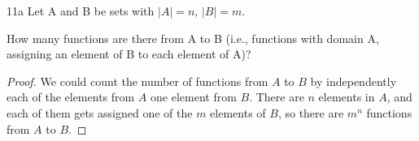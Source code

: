 \begin{exercise}{11a}
Let A and B be sets with $|A| = n$, $|B| = m$.

\vspace{1em}
How many functions are there from A to B (i.e., functions with domain A, assigning
an element of B to each element of A)?
\end{exercise}

\begin{proof}
    We could count the number of functions from $A$ to $B$ by independently each of the elements from $A$ one element from $B$. There are $n$ elements in $A$, and each of them gets assigned one of the $m$ elements of $B$, so there are $m^n$ functions from $A$ to $B$.
\end{proof}



